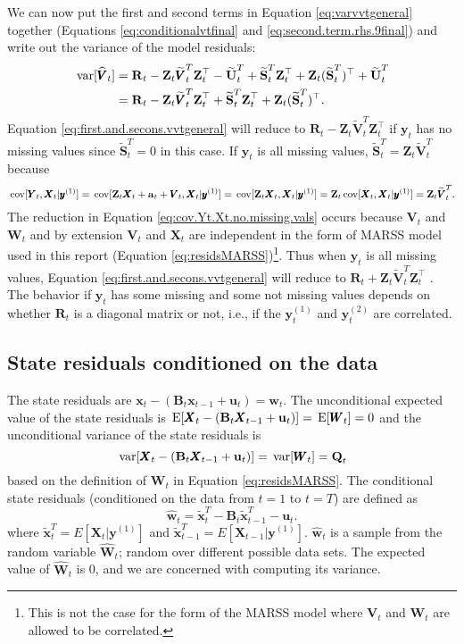 \documentclass[]{article}
\def\UPS{\mbox{\boldmath $\Upsilon$}}
\def\XI{\mbox{\boldmath $\Xi$}}
\def\BB{\mbox{$\mathbf B$}}	\def\bb{\mbox{$\mathbf b$}} \def\Bb{\mbox{$\mathbf J$}} \def\Ba{\mbox{$\mathbf L$}} \def\Bm{\UPS}
\def\E{\,\textup{\textrm{E}}}
\def\QQ{\mbox{$\mathbf Q$}}	 \def\qq{\mbox{$\mathbf q$}} \def\Qb{\mbox{$\mathbf G$}}  \def\Qm{\mathbb{Q}}
\def\RR{\mbox{$\mathbf R$}}	 \def\rr{\mbox{$\mathbf r$}} \def\Rb{\mbox{$\mathbf H$}}	\def\Rm{\mathbb{R}}
\def\Ss{\mbox{$\mathbf S$}}
\def\UU{\mbox{$\mathbf U$}}	\def\uu{\mbox{$\mathbf u$}}
\def\VV{\mbox{$\pmb{V}$}}	\def\vv{\mbox{$\pmb{v}$}}
\def\WW{\mbox{$\pmb{W}$}}	\def\ww{\mbox{$\pmb{w}$}}
\def\XX{\mbox{$\pmb{X}$}}	\def\xx{\mbox{$\pmb{x}$}}
\def\YY{\mbox{$\pmb{Y}$}}	\def\yy{\mbox{$\pmb{y}$}}
\def\ZZ{\mbox{$\mathbf Z$}}	\def\zz{\mbox{$\mathbf z$}}	\def\Zb{\mbox{$\mathbf M$}} \def\Za{\mbox{$\mathbf N$}} \def\Zm{\XI}
\def\var{\,\textup{\textrm{var}}}
\def\cov{\,\textup{\textrm{cov}}}
\def\hatxtT{\widetilde{\xx}_t^T}
\def\hatxtmT{\widetilde{\xx}_{t-1}^T}
\def\hatWt{\widehat{\WW}_t}
\def\hatwt{\widehat{\ww}_t}
\def\hatVt{\widehat{\VV}_t}
\def\hatVtT{\widetilde{\VV}_t^T}
\def\hatUtT{\widetilde{\UU}_t^T}
\def\hatStT{\widetilde{\Ss}_t^T}
\begin{document}
We can now put the first and second terms in Equation \ref{eq:varvvtgeneral} together (Equations \ref{eq:conditionalvtfinal} and \ref{eq:second.term.rhs.9final}) and write out the variance of the model residuals:
\begin{equation}\label{eq:first.and.secons.vvtgeneral}
\begin{split}
\var[\hatVt] &= \RR_t - \ZZ_t \hatVtT \ZZ_t^\top - \hatUtT + \hatStT\ZZ_t^\top + \ZZ_t(\hatStT)^\top + \hatUtT\\
&= \RR_t - \ZZ_t \hatVtT \ZZ_t^\top + \hatStT\ZZ_t^\top + \ZZ_t(\hatStT)^\top .
\end{split}
\end{equation}
Equation \ref{eq:first.and.secons.vvtgeneral} will reduce to $\RR_t - \ZZ_t \hatVtT \ZZ_t^\top$ if $\yy_t$ has no missing values since $\hatStT = 0$ in this case.  If $\yy_t$ is all missing values, $\hatStT = \ZZ_t \hatVtT$ because 
\begin{equation}\label{eq:cov.Yt.Xt.no.missing.vals}
\cov[\YY_t, \XX_t|\yy^{(1)}] = \cov[\ZZ_t \XX_t + \aa_t + \VV_t, \XX_t|\yy^{(1)}] = \cov[\ZZ_t \XX_t, \XX_t|\yy^{(1)}] = \ZZ_t \cov[\XX_t, \XX_t|\yy^{(1)}] = \ZZ_t \hatVtT .
\end{equation}
The reduction in Equation \ref{eq:cov.Yt.Xt.no.missing.vals} occurs because $\VV_t$ and $\WW_t$ and by extension $\VV_t$ and $\XX_t$ are independent in the form of MARSS model used in this report (Equation \ref{eq:residsMARSS})\footnote{This is not the case for the \citet{Harveyetal1998} form of the MARSS model where $\VV_t$ and $\WW_t$ are allowed to be correlated.}. Thus when $\yy_t$ is all missing values, Equation \ref{eq:first.and.secons.vvtgeneral} will reduce to $\RR_t + \ZZ_t \hatVtT \ZZ_t^\top$ . The behavior if $\yy_t$ has some missing and some not missing values depends on whether $\RR_t$ is a diagonal matrix or not, i.e., if the $\yy_t^{(1)}$ and $\yy_t^{(2)}$ are correlated.

\subsection{State residuals conditioned on the data}

The state residuals are $\xx_t - (\BB_t \xx_{t-1} + \uu_t)=\ww_t$.  The unconditional expected value of the state residuals is $\E[\XX_t - (\BB_t \XX_{t-1} + \uu_t)] = \E[\WW_t] = 0$ and the unconditional variance of the state residuals is
\begin{equation}
\var[\XX_t - (\BB_t \XX_{t-1} + \uu_t)] = \var[\WW_t] = \QQ_t
\end{equation}
based on the definition of $\WW_t$ in Equation \ref{eq:residsMARSS}.
The conditional state residuals (conditioned on the data from $t=1$ to $t=T$) are defined as
\begin{equation}
\hatwt = \hatxtT - \BB_t\hatxtmT - \uu_t.
\end{equation}
where $\hatxtT = E[\XX_t|\yy^{(1)}]$ and $\hatxtmT = E[\XX_{t-1}|\yy^{(1)}]$.  $\hatwt$ is a sample from the random variable $\hatWt$; random over different possible data sets.  The expected value of $\hatWt$ is 0, and we are concerned with computing its variance.
\end{document}

